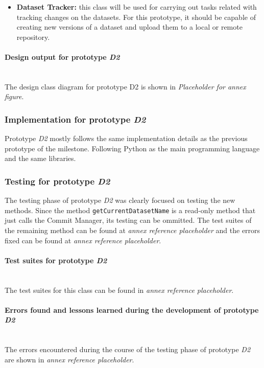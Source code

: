 \begin{itemize}
    \item \textbf{Dataset Tracker: }this class will be used for carrying out tasks related with tracking changes on the datasets. For this prototype, it should be capable of creating new versions of a dataset and upload them to a local or remote repository.
\end{itemize}

\paragraph{Design output for prototype \emph{D2}}\mbox{}\\

The design class diagram for prototype D2 is shown in \emph{Placeholder for annex figure}.

\subsubsection{Implementation for prototype \emph{D2}}

Prototype \emph{D2} mostly follows the same implementation details as the previous prototype of the milestone. Following Python as the main programming language and the same
libraries.

\subsubsection{Testing for prototype \emph{D2}}

The testing phase of prototype \emph{D2} was clearly focused on testing the new methods. Since the method \texttt{getCurrentDatasetName} is a read-only 
method that just calls the Commit Manager, its testing can be ommitted. The test suites of the remaining method can be found at \emph{annex reference placeholder} and the errors fixed can be found at \emph{annex reference placeholder}.

\paragraph{Test suites for prototype \emph{D2}}\mbox{}\\

The test suites for this class can be found in \emph{annex reference placeholder}.

\paragraph{Errors found and lessons learned during the development of prototype \emph{D2}}\mbox{}\\

The errors encountered during the course of the testing phase of prototype \emph{D2} are shown in \emph{annex reference placeholder}.

